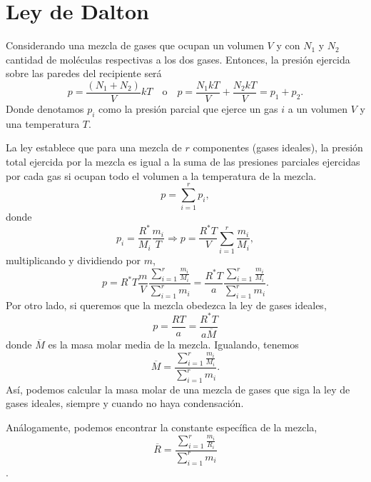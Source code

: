 \documentclass[openany]{book}
\begin{document}
\section{Ley de Dalton}
Considerando una mezcla de gases que ocupan un volumen $V$ y con $N_1$ y $N_2$ cantidad de moléculas respectivas a los dos gases. Entonces, la presión ejercida sobre las paredes del recipiente será
\begin{equation*}
	p=\frac{(N_1+N_2)}{V}kT\quad \mathrm{o}\quad p=\frac{N_1kT}{V}+\frac{N_2kT}{V}=p_1+p_2.
\end{equation*}
Donde denotamos $p_i$ como la presión parcial que ejerce un gas $i$ a un volumen $V$ y una temperatura $T$.\par
La ley establece que para una mezcla de $r$ componentes (gases ideales), la presión total ejercida por la mezcla es igual a la suma de las presiones parciales ejercidas por cada gas si ocupan todo el volumen a la temperatura de la mezcla.
\begin{equation}
	p=\sum_{i=1}^{r}p_i,
\end{equation}
donde
\begin{equation*}
	p_i=\frac{R^*}{M_i}\frac{m_i}{T}\Rightarrow p=\frac{R^*T}{V}\sum_{i=1}^{r}{\frac{m_i}{M_i}},
\end{equation*}
multiplicando y dividiendo por $m$,
\begin{equation*}
	p=R^*T\frac{m}{V}\frac{\sum_{i=1}^{r}\frac{m_i}{M_i}}{\sum_{i=1}^{r}m_i}=\frac{R^*T}{a}\frac{\sum_{i=1}^{r}\frac{m_i}{M_i}}{\sum_{i=1}^{r}m_i}.
\end{equation*}
Por otro lado, si queremos que la mezcla obedezca la ley de gases ideales,
\begin{equation*}
	p=\frac{RT}{a}=\frac{R^*T}{a\overline{M}}
\end{equation*}
donde $\overline{M}$ es la masa molar media de la mezcla. Igualando, tenemos
\begin{equation}\label{eq:masamolarmezc}
	\overline{M}=\frac{\sum_{i=1}^{r}\frac{m_i}{M_i}}{\sum_{i=1}^{r}m_i}.
\end{equation}
Así, podemos calcular la masa molar de una mezcla de gases que siga la ley de gases ideales, siempre y cuando no haya condensación.\par
Análogamente, podemos encontrar la constante específica de la mezcla,
\begin{equation}
	\overline{R}=\frac{\sum_{i=1}^{r}\frac{m_i}{R_i}}{\sum_{i=1}^{r}m_i}
\end{equation}.
\end{document}
